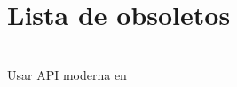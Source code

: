 \chapter{Lista de obsoletos }
\hypertarget{deprecated}{}\label{deprecated}

\begin{DoxyRefList}
\item[{\parbox[t]{\linewidth}{Global \doxylink{wifi__app_8h_a56633849de02c2abb38c9f47ef6fee1f}{save\+\_\+reg\+\_\+data} (uint8\+\_\+t register, char \texorpdfstring{$\ast$}{*}str)}}]\hfill \\
\label{deprecated__deprecated000001}%
%
Usar API moderna en  
\end{DoxyRefList}